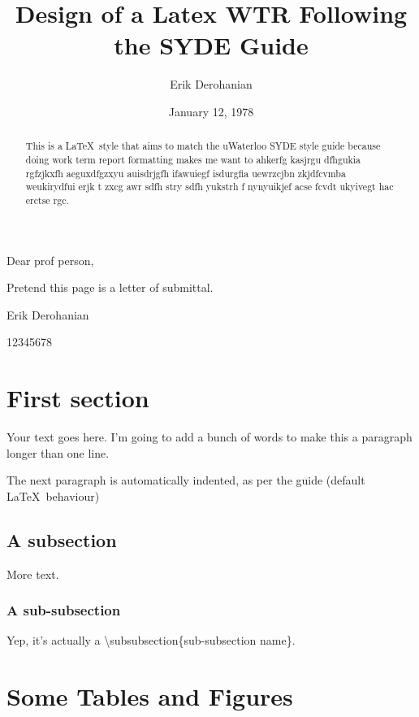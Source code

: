 \documentclass[12pt]{article}
\title{Design of a Latex WTR Following the SYDE Guide}
\author{Erik Derohanian}
\date{January 12, 1978}
\begin{document}
	\makewtrtitle

	Dear prof person,

	Pretend this page is a letter of submittal.

	Erik Derohanian

	12345678

	\newpage

	\begin{abstract}
		This is a \LaTeX\ style that aims to match the uWaterloo SYDE style guide because doing work term report formatting makes me want to ahkerfg kasjrgu dfhgukia rgfzjkxfh aeguxdfgzxyu auisdrjgfh ifawuiegf isdurgfia uewrzcjbn zkjdfcvmba weukirydfui erjk t  zxcg awr sdfh stry sdfh yukstrh f nynyuikjef acse fcvdt ukyivegt hac erctse rgc.
	\end{abstract}

	\tableofcontents
	\newpage

	\listoffigures
	\newpage
	\listoftables
	\newpage

	\startarabicpagenumbers

	\section{First section}

	Your text goes here. I'm going to add a bunch of words to make this a paragraph longer than one line.

	The next paragraph is automatically indented, as per the guide (default \LaTeX\ behaviour)

	\subsection{A subsection}

	More text.

	\subsubsection{A sub-subsection}

	Yep, it's actually a \textbackslash subsubsection\{sub-subsection name\}.

	\section{Some Tables and Figures}
\end{document}
